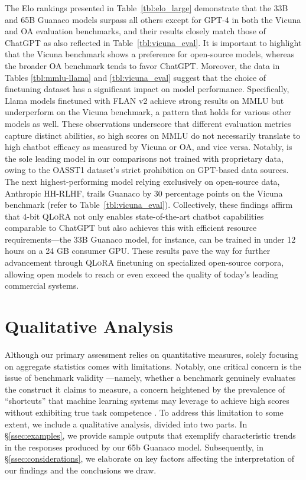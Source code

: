 The Elo rankings presented in Table~\ref{tbl:elo_large} demonstrate that the 33B and 65B {Guanaco} models surpass all others except for GPT-4 in both the Vicuna and OA evaluation benchmarks, and their results closely match those of ChatGPT as also reflected in Table~\ref{tbl:vicuna_eval}. It is important to highlight that the Vicuna benchmark shows a preference for open-source models, whereas the broader OA benchmark tends to favor ChatGPT. Moreover, the data in Tables \ref{tbl:mmlu-llama} and \ref{tbl:vicuna_eval} suggest that the choice of finetuning dataset has a significant impact on model performance. Specifically, Llama models finetuned with FLAN v2 achieve strong results on MMLU but underperform on the Vicuna benchmark, a pattern that holds for various other models as well. These observations underscore that different evaluation metrics capture distinct abilities, so high scores on MMLU do not necessarily translate to high chatbot efficacy as measured by Vicuna or OA, and vice versa. Notably, 
 is the sole leading model in our comparisons not trained with proprietary data, owing to the OASST1 dataset’s strict prohibition on GPT-based data sources. The next highest-performing model relying exclusively on open-source data, Anthropic HH-RLHF, trails {Guanaco} by 30 percentage points on the Vicuna benchmark (refer to Table~\ref{tbl:vicuna_eval}). Collectively, these findings affirm that 4-bit \textsc{QLoRA} not only enables state-of-the-art chatbot capabilities comparable to ChatGPT but also achieves this with efficient resource requirements—the 33B {Guanaco} model, for instance, can be trained in under 12 hours on a 24 GB consumer GPU. These results pave the way for further advancement through \textsc{QLoRA} finetuning on specialized open-source corpora, allowing open models to reach or even exceed the quality of today’s leading commercial systems.

\section{Qualitative Analysis}

Although our primary assessment relies on quantitative measures, solely focusing on aggregate statistics comes with limitations. Notably, one critical concern is the issue of benchmark validity \citep{liao2021we}—namely, whether a benchmark genuinely evaluates the construct it claims to measure, a concern heightened by the prevalence of ``shortcuts'' that machine learning systems may leverage to achieve high scores without exhibiting true task competence \citep{gururangan2018annotation, poliak2018hypothesis}. To address this limitation to some extent, we include a qualitative analysis, divided into two parts. In \S\ref{ssec:examples}, we provide sample outputs that exemplify characteristic trends in the responses produced by our 65b {Guanaco} model. Subsequently, in \S\ref{ssec:considerations}, we elaborate on key factors affecting the interpretation of our findings and the conclusions we draw.


